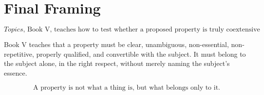\documentclass[12pt]{article}
\begin{document}
\section*{Final Framing}

\[
\boxed{
\textit{Topics}, \text{ Book V, teaches how to test whether a proposed property is truly coextensive with its subject without defining it.}
}
\]

Book V teaches that a property must be clear, unambiguous, non-essential,
non-repetitive, properly qualified, and convertible with the subject. It must
belong to the subject alone, in the right respect, without merely naming the
subject's essence.

\[
\boxed{
\text{A property is not what a thing is, but what belongs only to it.}
}
\]
\end{document}
